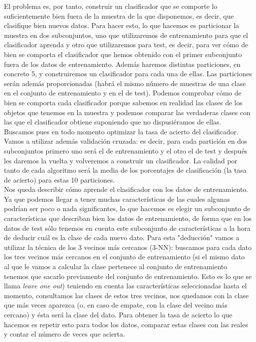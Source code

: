 \documentclass[12pt]{article}
\begin{document}
El problema es, por tanto, construir un clasificador que se comporte lo suficientemente bien fuera de la muestra de la que disponemos, es decir, que clasifique bien nuevos datos. Para hacer esto, lo que hacemos es particionar la muestra en dos subconjuntos, uno que utilizaremos de entrenamiento para que el clasificador aprenda y otro que utilizaremos para test, es decir, para ver cómo de bien se comporta el clasificador que hemos obtenido con el primer subconjunto fuera de los datos de entrenamiento. Además haremos distintas particiones, en concreto 5, y construiremos un clasificador para cada una de ellas. Las particiones serán además proporcionadas (habrá el mismo número de muestras de una clase en el conjunto de entrenamiento y en el de test). Podemos comprobar cómo de bien se comporta cada clasificador porque sabemos en realidad las clases de los objetos que tenemos en la muestra y podemos comparar las verdaderas clases con las que el clasificador obtiene suponiendo que no dispusiéramos de ellas.\\
Buscamos pues en todo momento optimizar la tasa de acierto del clasificador.\\
Vamos a utilizar además validación cruzada: es decir, para cada partición en dos subconjuntos primero uno será el de entrenamiento y el otro el de test y después les daremos la vuelta y volveremos a construir un clasificador. La calidad por tanto de cada algoritmo será la media de los porcentajes de clasificación (la tasa de acierto) para estas 10 particiones.\\

Nos queda describir cómo aprende el clasificador con los datos de entrenamiento. Ya que podemos llegar a tener muchas características de las cuales algunas podrían ser poco o nada significantes, lo que hacemos es elegir un subconjunto de características que describan bien los datos de entrenamiento, de forma que en los datos de test sólo tenemos en cuenta este subconjunto de características a la hora de deducir cuál es la clase de cada nuevo dato. Para esta "deducción" vamos a utilizar la técnica de los 3 vecinos más cercanos (3-NN): buscamos para cada dato los tres vecinos más cercanos en el conjunto de entrenamiento (si el mismo dato al que le vamos a calcular la clase pertenece al conjunto de entrenamiento tenemos que sacarlo previamente del conjunto de entrenamiento. Esto es lo que se llama \textit{leave one out}) teniendo en cuenta las características seleccionadas hasta el momento, consultamos las clases de estos tres vecinos, nos quedamos con la clase que más veces aparezca (o, en caso de empate, con la clase del vecino más cercano) y ésta será la clase del dato. Para obtener la tasa de acierto lo que hacemos es repetir esto para todos los datos, comparar estas clases con las reales y contar el número de veces que acierta.\\
\end{document}
